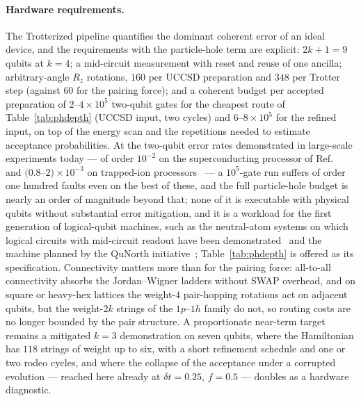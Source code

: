 \documentclass[
  aps,            %
  prc,            %
  reprint,        %
  superscriptaddress,
  floatfix,
  nofootinbib
]{revtex4-2}
\begin{document}
\paragraph{Hardware requirements.}
The Trotterized pipeline quantifies the dominant coherent error of an ideal
device, and the requirements with the particle-hole term are explicit:
$2k+1=9$ qubits at $k=4$; a mid-circuit measurement with reset and reuse of
one ancilla; arbitrary-angle $R_z$ rotations, $160$ per UCCSD preparation
and $348$ per Trotter step (against $60$ for the pairing force); and a
coherent budget per accepted preparation of $2$--$4\times10^{5}$ two-qubit
gates for the cheapest route of Table~\ref{tab:phdepth} (UCCSD input, two
cycles) and $6$--$8\times10^{5}$ for the refined input, on top of the energy
scan and the repetitions needed to estimate acceptance probabilities.  At
the two-qubit error rates demonstrated in large-scale experiments today ---
of order $10^{-2}$ on the superconducting processor of Ref.~\cite{Kim2023}
and $(0.8$--$2)\times10^{-3}$ on trapped-ion
processors~\cite{Moses2023,Ransford2025} --- a $10^{5}$-gate run suffers of
order one hundred faults even on the best of these, and the full
particle-hole budget is nearly an order of magnitude beyond that; none of it is
executable with physical qubits without substantial error mitigation, and
it is a workload for the first generation of logical-qubit machines, such as
the neutral-atom systems on which logical circuits with mid-circuit readout
have been demonstrated~\cite{Bluvstein2024,Reichardt2024} and the machine
planned by the QuNorth initiative~\cite{QuNorth}; Table~\ref{tab:phdepth} is
offered as its specification.  Connectivity matters more than for the
pairing force: all-to-all connectivity absorbs the Jordan--Wigner ladders
without SWAP overhead, and on square or heavy-hex lattices the weight-$4$
pair-hopping rotations act on adjacent qubits, but the weight-$2k$ strings
of the $1p$--$1h$ family do not, so routing costs are no longer bounded by
the pair structure.  A proportionate near-term target remains a mitigated
$k=3$ demonstration on seven qubits, where the Hamiltonian has $118$ strings
of weight up to six, with a short refinement schedule and one or two rodeo
cycles, and where the collapse of the acceptance under a corrupted evolution
--- reached here already at $\delta t=0.25$, $f=0.5$ --- doubles as a hardware
diagnostic.
\end{document}
